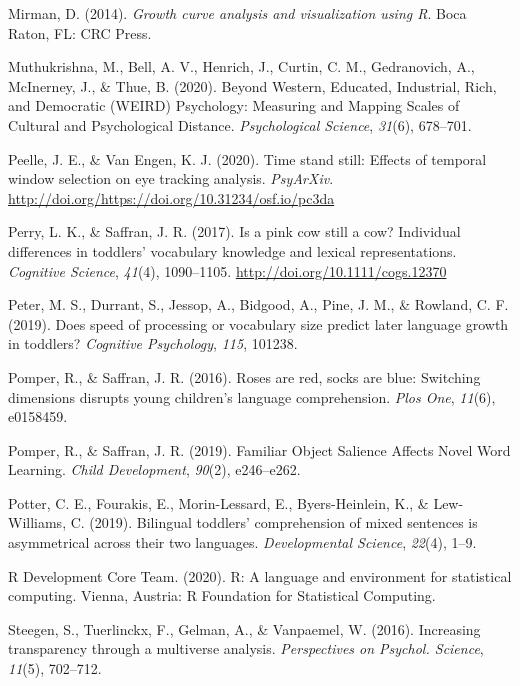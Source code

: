 \documentclass[10pt, letterpaper]{article}
\begin{document}
\leavevmode\hypertarget{ref-Mirman2014}{}%
Mirman, D. (2014). \emph{Growth curve analysis and visualization using
R}. Boca Raton, FL: CRC Press.

\leavevmode\hypertarget{ref-Muthukrishna2020}{}%
Muthukrishna, M., Bell, A. V., Henrich, J., Curtin, C. M., Gedranovich,
A., McInerney, J., \& Thue, B. (2020). Beyond Western, Educated,
Industrial, Rich, and Democratic (WEIRD) Psychology: Measuring and
Mapping Scales of Cultural and Psychological Distance.
\emph{Psychological Science}, \emph{31}(6), 678--701.

\leavevmode\hypertarget{ref-Peelle2020}{}%
Peelle, J. E., \& Van Engen, K. J. (2020). Time stand still: Effects of
temporal window selection on eye tracking analysis. \emph{PsyArXiv}.
\url{http://doi.org/https://doi.org/10.31234/osf.io/pc3da}

\leavevmode\hypertarget{ref-Perry2017}{}%
Perry, L. K., \& Saffran, J. R. (2017). Is a pink cow still a cow?
Individual differences in toddlers' vocabulary knowledge and lexical
representations. \emph{Cognitive Science}, \emph{41}(4), 1090--1105.
\url{http://doi.org/10.1111/cogs.12370}

\leavevmode\hypertarget{ref-peter2019}{}%
Peter, M. S., Durrant, S., Jessop, A., Bidgood, A., Pine, J. M., \&
Rowland, C. F. (2019). Does speed of processing or vocabulary size
predict later language growth in toddlers? \emph{Cognitive Psychology},
\emph{115}, 101238.

\leavevmode\hypertarget{ref-Pomper2016}{}%
Pomper, R., \& Saffran, J. R. (2016). Roses are red, socks are blue:
Switching dimensions disrupts young children's language comprehension.
\emph{Plos One}, \emph{11}(6), e0158459.

\leavevmode\hypertarget{ref-Pomper2019}{}%
Pomper, R., \& Saffran, J. R. (2019). Familiar Object Salience Affects
Novel Word Learning. \emph{Child Development}, \emph{90}(2), e246--e262.

\leavevmode\hypertarget{ref-Potter2019}{}%
Potter, C. E., Fourakis, E., Morin-Lessard, E., Byers-Heinlein, K., \&
Lew-Williams, C. (2019). Bilingual toddlers' comprehension of mixed
sentences is asymmetrical across their two languages.
\emph{Developmental Science}, \emph{22}(4), 1--9.

\leavevmode\hypertarget{ref-RDevelopmentCoreTeam2010}{}%
R Development Core Team. (2020). R: A language and environment for
statistical computing. Vienna, Austria: R Foundation for Statistical
Computing.

\leavevmode\hypertarget{ref-steegenEtAl2016}{}%
Steegen, S., Tuerlinckx, F., Gelman, A., \& Vanpaemel, W. (2016).
Increasing transparency through a multiverse analysis.
\emph{Perspectives on Psychol. Science}, \emph{11}(5), 702--712.
\end{document}
